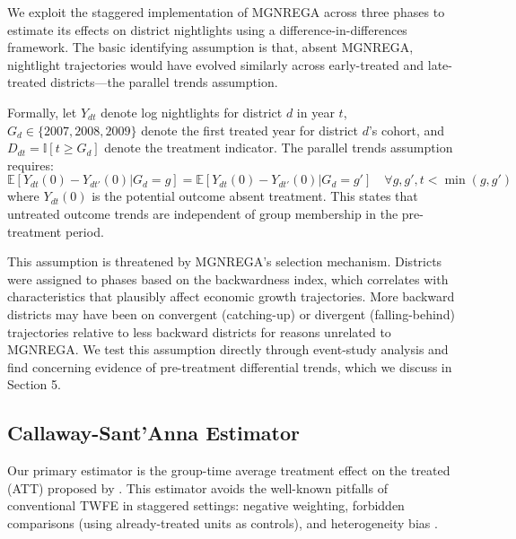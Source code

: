 \documentclass[12pt]{article}
\newcommand{\E}{\mathbb{E}}
\newcommand{\ind}{\mathbb{I}}
\begin{document}
We exploit the staggered implementation of MGNREGA across three phases to estimate its effects on district nightlights using a difference-in-differences framework. The basic identifying assumption is that, absent MGNREGA, nightlight trajectories would have evolved similarly across early-treated and late-treated districts---the parallel trends assumption.

Formally, let $Y_{dt}$ denote log nightlights for district $d$ in year $t$, $G_d \in \{2007, 2008, 2009\}$ denote the first treated year for district $d$'s cohort, and $D_{dt} = \ind[t \geq G_d]$ denote the treatment indicator. The parallel trends assumption requires:
\begin{equation}
\E[Y_{dt}(0) - Y_{dt'}(0) | G_d = g] = \E[Y_{dt}(0) - Y_{dt'}(0) | G_d = g'] \quad \forall g, g', t < \min(g, g')
\end{equation}
where $Y_{dt}(0)$ is the potential outcome absent treatment. This states that untreated outcome trends are independent of group membership in the pre-treatment period.

This assumption is threatened by MGNREGA's selection mechanism. Districts were assigned to phases based on the backwardness index, which correlates with characteristics that plausibly affect economic growth trajectories. More backward districts may have been on convergent (catching-up) or divergent (falling-behind) trajectories relative to less backward districts for reasons unrelated to MGNREGA. We test this assumption directly through event-study analysis and find concerning evidence of pre-treatment differential trends, which we discuss in Section 5.

\subsection{Callaway-Sant'Anna Estimator}

Our primary estimator is the group-time average treatment effect on the treated (ATT) proposed by \citet{callaway2021difference}. This estimator avoids the well-known pitfalls of conventional TWFE in staggered settings: negative weighting, forbidden comparisons (using already-treated units as controls), and heterogeneity bias \citep{goodman2021difference, dechaisemartin2020two}.
\end{document}
